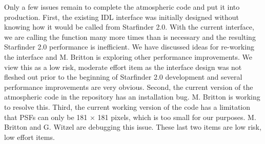 Only a few issues remain to complete the atmospheric code and put it into production. First, the existing IDL interface was initially designed without knowing how it would be called from Starfinder 2.0. With the current interface, we are calling the function many more times than is necessary and the resulting Starfinder 2.0 performance is inefficient. We have discussed ideas for re-working the interface and M. Britton is exploring other performance improvements. We view this as a low risk, moderate effort item as the interface design was not fleshed out prior to the beginning of Starfinder 2.0 development and several performance improvements are very obvious. Second, the current version of the atmospheric code in the repository has an installation bug. M. Britton is working to resolve this. Third, the current working version of the code has a limitation that PSFs can only be 181 $\times$ 181 pixels, which is too small for our purposes. M. Britton and G. Witzel are debugging this issue. These last two items are low risk, low effort items.

